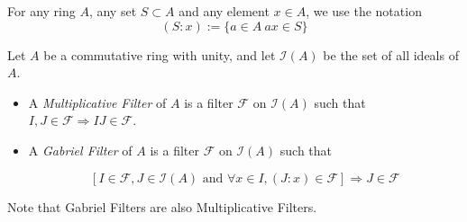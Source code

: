 \documentclass[12pt]{article}
\begin{document}
For any ring $A$, any set $S\subset A$ and any element $x\in A$,
we use the notation 
$$(S:x):=\{ a\in A\ ax\in S\}$$

Let $A$ be a commutative ring with unity, and let $\mathcal{I}(A)$
be the set of all ideals of $A$.
\begin{itemize}
\item A \emph{Multiplicative Filter} of $A$ is a filter $\mathcal{F}$
on $\mathcal{I}(A)$ such that $I,J\in\mathcal{F}\Rightarrow IJ\in\mathcal{F}$. 
\item A \emph{Gabriel Filter} of $A$ is a filter $\mathcal{F}$ on $\mathcal{I}(A)$
such that

$$ [I\in\mathcal{F},J\in\mathcal{I}(A)\textrm{ and }\forall x\in I,(J:x)\in\mathcal{F}]\Rightarrow J\in\mathcal{F} $$
\end{itemize}

Note that Gabriel Filters are also Multiplicative Filters.

\end{document}
